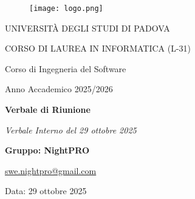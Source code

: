 \documentclass[a4paper, 11pt, oneside]{scrartcl} %
\begin{document}
\thispagestyle{empty}
\begin{titlepage}
    \centering
    
\begin{figure}
    \centering
    \texttt{[image: logo.png]}
\end{figure}

    \vfill
    
    {\small UNIVERSITÀ DEGLI STUDI DI PADOVA \par}
    {\small CORSO DI LAUREA IN INFORMATICA (L-31) \par}
    \vspace{0.5cm}
    {\large Corso di Ingegneria del Software \par}
    {\small Anno Accademico 2025/2026 \par}
    
    \vfill
    
    {\Huge \bfseries Verbale di Riunione \par}
    
    \vspace{1cm}
    
    {\Large \itshape Verbale Interno del 29 ottobre 2025 \par} 
    
    \vfill
    
    {\Large \bfseries Gruppo: NightPRO \par}
    \vspace{0.5cm}
    {\large \href{mailto:swe.nightpro@gmail.com}{swe.nightpro@gmail.com} \par}
    
    \vfill
  
    {\large Data: 29 ottobre 2025 \par}

\end{titlepage}

\newpage
\tableofcontents %
\pagestyle{fancy} %

\newpage
\end{document}
